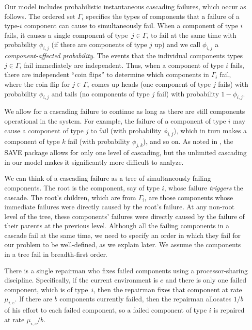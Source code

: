 \documentclass[12pt]{article}
\begin{document}
Our model includes probabilistic instantaneous cascading failures, which occur as follows. The ordered set $\Gamma_i$ specifies the types of components that a failure of a type-$i$ component can cause to simultaneously fail. When a component of type $i$ fails, it causes a single  component of type~$j \in \Gamma_i$ to fail at the same time with probability $\phi_{i, j}$ (if there are components of type $j$ up) and we call $\phi_{i, j}$  a \textit{component-affected probability}. The events that the individual components types~$j \in \Gamma_i$ fail immediately are independent. Thus, when a component of type $i$ fails, there are independent ``coin flips'' to determine which components in $\Gamma_i$ fail, where the coin flip for $j \in \Gamma_i$ comes up heads (one component of type $j$ fails) with probability $\phi_{i, j}$ and tails (no components of type $j$ fail) with probability $1 - \phi_{i, j}$.

We allow for a cascading failure to continue as long as there are still components operational in the system.  For example, the failure of a component of type $i$ may cause a component of type $j$ to fail (with probability $\phi_{i, j}$), which in turn makes a component of type $k$ fail (with probability $\phi_{j, k}$), and so on. As noted in \cite{ING:2009}, the SAVE package \cite{BHLNS:1994} allows for only one level of cascading, but the unlimited cascading in our model makes it significantly more difficult to analyze.

We can think of a cascading failure as a tree of simultaneously failing components. The root is the component, say of type $i$, whose failure \textit{triggers} the cascade. The root's children, which are from $\Gamma_i$, are those components whose immediate failures were directly caused by the root's failure. At any non-root level of the tree,  these components' failures were directly caused by the failure of their parents at the previous level. Although all the failing components in a cascade fail at the same time, we need to specify an order in which they fail for our problem to be well-defined, as we explain later. We assume the components in a tree fail in breadth-first order.

There is a single repairman who fixes failed components using a processor-sharing discipline. Specifically, if the current environment is $e$ and there is only one failed component, which is of type~$i$, then the repairman fixes that component at rate $\mu_{i, e}$. If there are $b$ components currently failed, then the repairman allocates $1 / b$ of his effort to each failed component, so a failed component of type $i$ is repaired at rate $\mu_{i, e}/b$.
\end{document}
